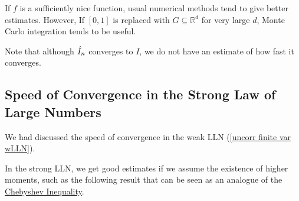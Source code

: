 If $f$ is a sufficiently nice function, usual numerical methods tend to give better estimates. However, If $[0,1]$ is replaced with $G\subseteq\mathbb{R}^d$ for very large $d$, Monte Carlo integration tends to be useful. 

\vspace{1mm}
Note that although $\Hat{I}_n$ converges to $I$, we do not have an estimate of how fast it converges.

\subsection{Speed of Convergence in the Strong Law of Large Numbers}

We had discussed the speed of convergence in the weak LLN (\cref{uncorr finite var wLLN}).

In the strong LLN, we get good estimates if we assume the existence of higher moments, such as the following result that can be seen as an analogue of the \hyperref[chebyshev inequality]{Chebyshev Inequality}.

